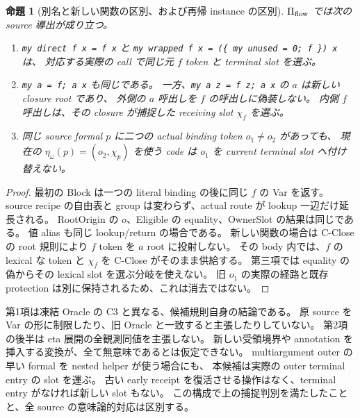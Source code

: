 \documentclass[11pt,a4paper]{article}
\newtheorem{proposition}[definition]{命題}
\begin{document}
\begin{proposition}[別名と新しい関数の区別、および再帰 instance の区別]
\label{prop:alias-origin}
\(\Pi_{\rm flow}\) では次の source 導出が成り立つ。
\begin{enumerate}
\item \texttt{my direct f x = f x} と
\texttt{my wrapped f x = (\{ my unused = 0; f \}) x} は、
対応する実際の call で同じ元 \(f\) token と terminal slot を選ぶ。
\item \texttt{my a = f; a x} も同じである。
一方、\texttt{my a z = f z; a x} の \(a\) は新しい closure root であり、
外側の \(a\) 呼出しを \(f\) の呼出しに偽装しない。
内側 \(f\) 呼出しは、その closure が捕捉した receiving slot \(\chi_f\) を選ぶ。
\item 同じ source formal \(p\) に二つの actual binding token \(o_1\ne o_2\) があっても、
現在の \(\eta_\omega(p)=(o_2,\chi_p)\) を使う code は \(o_1\) を current terminal slot へ付け替えない。
\end{enumerate}
\end{proposition}
\begin{proof}
最初の Block は一つの literal binding の後に同じ \(f\) の Var を返す。
source recipe の自由表と group は変わらず、actual route が lookup 一辺だけ延長される。
RootOrigin の \(o\)、Eligible の equality、OwnerSlot の結果は同じである。
値 alias も同じ lookup/return の場合である。
新しい関数の場合は C-Close の root 規則により \(f\) token を \(a\) root に投射しない。
その body 内では、\(f\) の lexical な token と \(\chi_f\) を C-Close がそのまま供給する。
第三項では equality の偽からその lexical slot を選ぶ分岐を使えない。
旧 \(o_1\) の実際の経路と既存 protection は別に保持されるため、これは消去ではない。
\end{proof}

第1項は凍結 Oracle の C3 と異なる、候補規則自身の結論である。
原 source を Var の形に制限したり、旧 Oracle と一致すると主張したりしていない。
第2項の後半は eta 展開の全観測同値を主張しない。
新しい受領境界や annotation を挿入する変換が、全て無意味であるとは仮定できない。
multiargument outer の早い formal を nested helper が使う場合にも、
本候補は実際の outer terminal entry の slot を運ぶ。
古い early receipt を復活させる操作はなく、terminal entry がなければ新しい slot もない。
この構成で上の捕捉判別を満たしたことと、全 source の意味論的対応は区別する。
\end{document}
